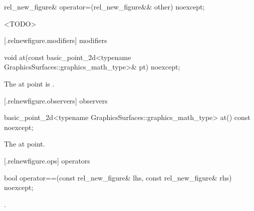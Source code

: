 %
\begin{itemdecl}
rel_new_figure& operator=(rel_new_figure&& other) noexcept;
\end{itemdecl}
\begin{itemdescr}
\pnum
\effects
<TODO>

\pnum
\returns
{}
\end{itemdescr}

 [\iotwod.relnewfigure.modifiers]{ modifiers}%

%
\begin{itemdecl}
void at(const basic_point_2d<typename GraphicsSurfaces::graphics_math_type>& pt) noexcept;
\end{itemdecl}
\begin{itemdescr}
\pnum
\effects
The at point is .
\end{itemdescr}

 [\iotwod.relnewfigure.observers]{ observers}%

%
\begin{itemdecl}
basic_point_2d<typename GraphicsSurfaces::graphics_math_type> at() const noexcept;
\end{itemdecl}
\begin{itemdescr}
\pnum
\returns
The at point.
\end{itemdescr}

 [\iotwod.relnewfigure.ops]{ operators}%

%
\begin{itemdecl}
bool operator==(const rel_new_figure& lhs, const rel_new_figure& rhs) noexcept;
\end{itemdecl}
\begin{itemdescr}
\pnum
\returns
{}.
\end{itemdescr}

